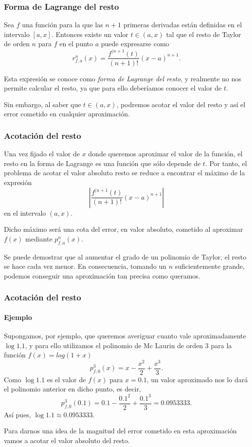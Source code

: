 \begin{frame}
\frametitle{Forma de Lagrange del resto}
\begin{teorema}[Lagrange]
Sea $f$ una función para la que las $n+1$ primeras derivadas están definidas en el intervalo $[a,x]$. Entonces existe un valor $t\in(a,x)$ tal que el resto de Taylor de orden $n$ para $f$ en el punto $a$ puede expresarse como
\[
r_{f,a}^n(x)=\frac{f^{(n+1}(t)}{(n+1)!}(x-a)^{n+1}.
\]
\end{teorema}

Esta expresión se conoce como \emph{forma de Lagrange del resto}, y realmente no nos permite calcular el resto, ya que para ello deberíamos conocer el valor de $t$.

Sin embargo, al saber que $t\in (a,x)$, podremos acotar el valor del resto y así el error cometido en cualquier aproximación.
\end{frame}


\begin{frame}
\frametitle{Acotación del resto}
Una vez fijado el valor de $x$ donde queremos aproximar el valor de la función, el resto en la forma de Lagrange es una función que sólo depende de $t$. Por tanto, el problema de acotar el valor absoluto resto se reduce a encontrar el máximo de la expresión
\[
\left|
\frac{f^{(n+1}(t)}{(n+1)!}(x-a)^{n+1}
\right|
\]
en el intervalo $(a,x)$.

Dicho máximo será una cota del error, en valor absoluto, cometido al aproximar $f(x)$ mediante $p_{f,a}^n(x)$.

Se puede demostrar que al aumentar el grado de un polinomio de Taylor, el resto se hace cada vez menor. En
consecuencia, tomando un $n$ suficientemente grande, podemos conseguir una aproximación tan precisa como queramos. 
\end{frame}


\begin{frame}
\frametitle{Acotación del resto}
\framesubtitle{Ejemplo}
Supongamos, por ejemplo, que queremos averiguar cuanto vale aproximadamente $\log 1.1$, y para ello utilizamos el polinomio de Mc Laurin de orden $3$ para la función $f(x)=log(1+x)$
\[
p_{f,0}^3(x)=x-\frac{x^2}{2}+\frac{x^3}{3}.
\]
Como $\log 1.1$ es el valor de $f(x)$ para $x=0.1$, un valor aproximado nos lo dará el polinomio anterior en dicho punto, es decir,
\[
p_{f,0}^3(0.1)=0.1-\frac{0.1^2}{2}+\frac{0.1^3}{3}=0.0953333.
\]
Así pues, $\log 1.1\approx 0.0953333$.

Para darnos una idea de la magnitud del error cometido en esta aproximación vamos a acotar el valor absoluto del resto.
\end{frame}


